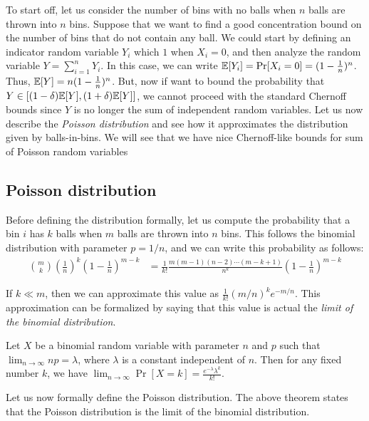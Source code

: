 To start off, let us consider the number of bins with no balls when $n$ balls
are thrown into $n$ bins. Suppose that we want to find a good concentration
bound on the number of bins that do not contain any ball. We could start by
defining an indicator random variable $Y_i$ which $1$ when $X_i =0$, and then
analyze the random variable $Y = \sum_{i=1}^n Y_i$. In this case, we can write
$\mathbb{E}[Y_i] = \Pr[X_i=0] = (1-\tfrac{1}{n})^n$. Thus,
$\mathbb{E}[Y] = n(1-\tfrac{1}{n})^n$. But, now if want to bound the probability that
$Y \in [(1-\delta)\mathbb{E}[Y], (1+\delta)\mathbb{E}[Y]]$, we cannot proceed with the standard
Chernoff bounds since $Y$ is no longer the sum of independent random
variables. Let us now describe the \emph{Poisson distribution} and see how it
approximates the distribution given by balls-in-bins. We will see that we have
nice Chernoff-like bounds for sum of Poisson random variables

\subsection{Poisson distribution}

Before defining the distribution formally, let us compute the probability that a bin $i$ has $k$ balls when $m$ balls are thrown into $n$ bins. This follows the binomial distribution with parameter $p = 1/n$, and we can write this probability as follows:
\begin{align*}
  \binom{m}{k}\left(\frac{1}{n} \right)^k \left(1-\frac{1}{n} \right)^{m-k} &= \frac{1}{k!} \frac{m(m-1)(n-2)\cdots (m-k+1)}{n^k} \left(1-\frac{1}{n} \right)^{m-k}
\end{align*}

If $k \ll m$, then we can approximate this value as $\tfrac{1}{k!}(m/n)^ke^{-m/n}$. This approximation can be formalized by saying that this value is actual the \emph{limit of the binomial distribution}.

\begin{theorem}
  Let $X$ be a binomial random variable with parameter $n$ and $p$ such that
  $\lim_{n\to \infty} np = \lambda$, where $\lambda$ is a constant independent
  of $n$. Then for any fixed number $k$, we have
  $\lim_{n\to \infty} \Pr[X=k] = \frac{e^{-\lambda} \lambda^k}{k!}$.
  \label{thm:binom-poi}
\end{theorem}

Let us now formally define the Poisson distribution. The above theorem states
that the Poisson distribution is the limit of the binomial distribution.

